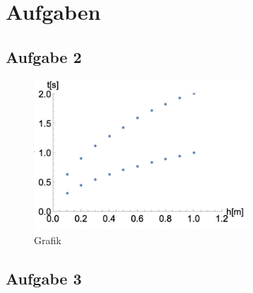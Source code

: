 \documentclass[12pt, a4paper, twoside]{article}
\begin{document}
    \section{Aufgaben}
    \subsection{Aufgabe 2}
    \begin{figure}[h]
        \begin{center}
            \includegraphics[width=8cm]{aufgabe2.png}
            \caption{Grafik}
            \label{fig:figure1}        
        \end{center}
    \end{figure}
    \subsection{Aufgabe 3}
\end{document}

